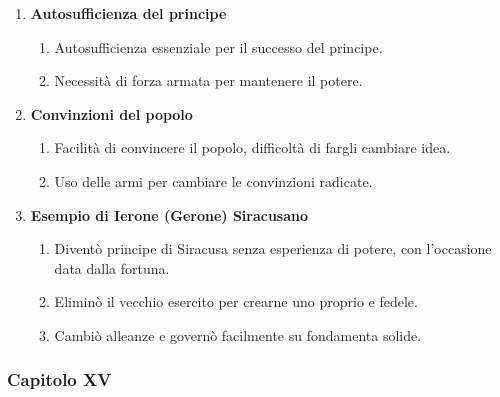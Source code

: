 \documentclass{article}
\begin{document}
\begin{enumerate}
    \item \textbf{Autosufficienza del principe}
    \begin{enumerate}[label*=\arabic*.]
        \item Autosufficienza essenziale per il successo del principe.
        \item Necessità di forza armata per mantenere il potere.
    \end{enumerate}

    \item \textbf{Convinzioni del popolo}
    \begin{enumerate}[label*=\arabic*.]
        \item Facilità di convincere il popolo, difficoltà di fargli cambiare idea.
        \item Uso delle armi per cambiare le convinzioni radicate.
    \end{enumerate}

    \item \textbf{Esempio di Ierone (Gerone) Siracusano}
    \begin{enumerate}[label*=\arabic*.]
        \item Diventò principe di Siracusa senza esperienza di potere, con l'occasione data dalla fortuna.
        \item Eliminò il vecchio esercito per crearne uno proprio e fedele.
        \item Cambiò alleanze e governò facilmente su fondamenta solide.
    \end{enumerate}
\end{enumerate}

\newpage
\subsubsection{Capitolo XV}
\end{document}
